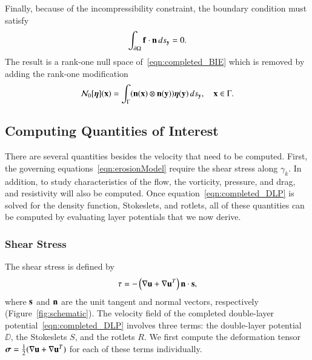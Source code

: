 \documentclass[preprint, 10pt]{elsarticle}
\begin{document}
Finally, because of the incompressibility constraint, the boundary
condition must satisfy 
\begin{align*}
  \int_{\bd\Omega} \ff \cdot \nn \, ds_\yy = 0.
\end{align*}
The result is a rank-one null space of~\eqref{eqn:completed_BIE} which
is removed by adding the rank-one modification 
\begin{align}
  \NN_0[\eeta](\xx) = \int_{\Gamma} 
    (\nn(\xx) \otimes \nn(\yy))\eeta(\yy) \, ds_\yy, \quad \xx \in \Gamma.
\end{align}



\subsection{Computing Quantities of Interest}
\label{sec:qois}
There are several quantities besides the velocity that need to be
computed.  First, the governing equations~\eqref{eqn:erosionModel}
require the shear stress along $\gamma_k$.  In addition, to study
characteristics of the flow, the vorticity, pressure, and drag, and
resistivity will also be computed.  Once
equation~\eqref{eqn:completed_DLP} is solved for the density function,
Stokeslets, and rotlets, all of these quantities can be computed by
evaluating layer potentials that we now derive.

\subsubsection{Shear Stress}
The shear stress is defined by
\begin{align*}
  \tau = -\left(\nabla \uu + \nabla \uu^T \right)\nn \cdot \ss,
\end{align*}
where $\ss$ and $\nn$ are the unit tangent and normal vectors,
respectively (Figure~\ref{fig:schematic}).  The velocity field of the
completed double-layer potential~\eqref{eqn:completed_DLP} involves
three terms: the double-layer potential $\DD$, the Stokeslets $S$, and
the rotlets $R$.  We first compute the deformation tensor $\ssigma =
\frac{1}{2}(\nabla\uu + \nabla\uu^T)$ for each of these terms
individually.
\end{document}
